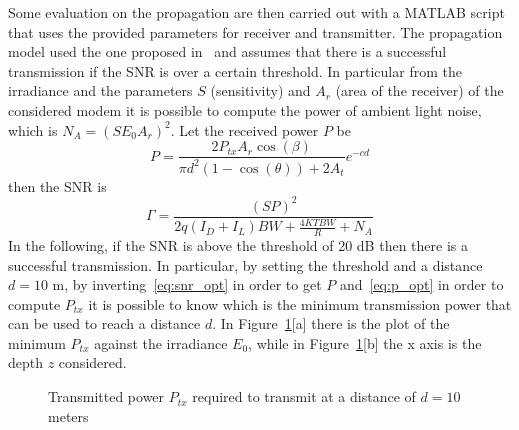 \documentclass[10pt]{article}
\begin{document}
Some evaluation on the propagation are then carried out with a MATLAB script that uses the provided parameters for receiver and transmitter. The propagation model used the one proposed in~\cite{optmodel} and assumes that there is a successful transmission if the SNR is over a certain threshold. In particular from the irradiance and the parameters $S$ (sensitivity) and $A_r$ (area of the receiver) of the considered modem it is possible to compute the power of ambient light noise, which is $N_A = (S E_0 A_r)^2$. Let the received power $P$ be
\begin{equation}
	P = \frac{2 P_{tx} A_r \cos(\beta)}{\pi d^2 (1-\cos(\theta)) + 2 A_t}e^{-cd}
	\label{eq:p_opt}
\end{equation}
then the SNR is
\begin{equation}
	\Gamma  = \frac{(SP)^2}{2q(I_D + I_L)BW + \frac{4KTBW}{R} + N_A}
	\label{eq:snr_opt}
\end{equation}
In the following, if the SNR is above the threshold of 20 dB then there is a successful transmission. In particular, by setting the threshold and a distance $d = 10$ m, by inverting~\eqref{eq:snr_opt} in order to get $P$ and~\eqref{eq:p_opt} in order to compute $P_{tx}$ it is possible to know which is the minimum transmission power that can be used to reach a distance $d$. In Figure~\ref{fig:ptx}[a] there is the plot of the minimum $P_{tx}$ against the irradiance $E_0$, while in Figure~\ref{fig:ptx}[b] the x axis is the depth $z$ considered.

\begin{figure}[h!]
	\centering
	\caption{Transmitted power $P_{tx}$ required to transmit at a distance of $d = 10$ meters}
	\label{fig:ptx}
\end{figure}
\end{document}
